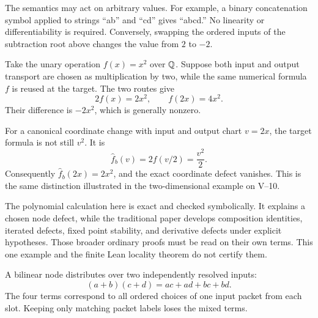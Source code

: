 The semantics may act on arbitrary values. For example, a binary concatenation symbol applied to strings ``ab'' and ``cd'' gives ``abcd.'' No linearity or differentiability is required. Conversely, swapping the ordered inputs of the subtraction root above changes the value from $2$ to $-2$.


Take the unary operation $f(x)=x^2$ over $\mathbb Q$. Suppose both input and output transport are chosen as multiplication by two, while the same numerical formula $f$ is reused at the target. The two routes give
\[
2f(x)=2x^2,\qquad f(2x)=4x^2.
\]
Their difference is $-2x^2$, which is generally nonzero.


For a canonical coordinate change with input and output chart $v=2x$, the target formula is not still $v^2$. It is
\[
\widehat f_b(v)=2f(v/2)=\frac{v^2}{2}.
\]
Consequently $\widehat f_b(2x)=2x^2$, and the exact coordinate defect vanishes. This is the same distinction illustrated in the two-dimensional example on V--10.

The polynomial calculation here is exact and checked symbolically. It explains a chosen node defect, while the traditional paper develops composition identities, iterated defects, fixed point stability, and derivative defects under explicit hypotheses. Those broader ordinary proofs must be read on their own terms. This one example and the finite Lean locality theorem do not certify them.


A bilinear node distributes over two independently resolved inputs:
\[
(a+b)(c+d)=ac+ad+bc+bd.
\]
The four terms correspond to all ordered choices of one input packet from each slot. Keeping only matching packet labels loses the mixed terms.

